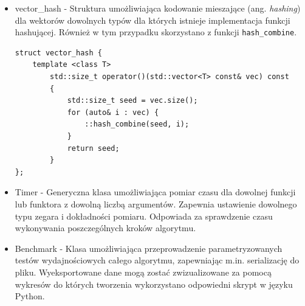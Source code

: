 \documentclass[12pt]{article}
\newcounter{operator}
\newcounter{algorytm}
\def\inline{\lstinline[basicstyle=\ttfamily,keywordstyle={}]}
\begin{document}
\begin{itemize}
\item vector\_hash - Struktura umożliwiająca kodowanie mieszające (ang. \textit{hashing}) dla wektorów dowolnych typów dla których istnieje implementacja funkcji hashującej. Również w tym przypadku skorzystano z funkcji \inline{hash_combine}.

\begin{minipage}{\linewidth}
\begin{lstlisting}[caption={Kod struktury vector\_hash}]
struct vector_hash {
	template <class T>
		std::size_t operator()(std::vector<T> const& vec) const 
        {
            std::size_t seed = vec.size();
            for (auto& i : vec) {
                ::hash_combine(seed, i);
            }
			return seed;
		}
};
\end{lstlisting}
\end{minipage}


\item Timer - Generyczna klasa umożliwiająca pomiar czasu dla dowolnej funkcji lub funktora z dowolną liczbą argumentów. Zapewnia ustawienie dowolnego typu zegara i dokładności pomiaru. Odpowiada za sprawdzenie czasu wykonywania poszczególnych kroków algorytmu.

\item Benchmark - Klasa umożliwiająca przeprowadzenie parametryzowanych testów wydajnościowych całego algorytmu, zapewniając m.in. serializację do pliku. Wyeksportowane dane mogą zostać zwizualizowane za pomocą wykresów do których tworzenia wykorzystano odpowiedni skrypt w języku Python.

\end{itemize}
\end{document}
